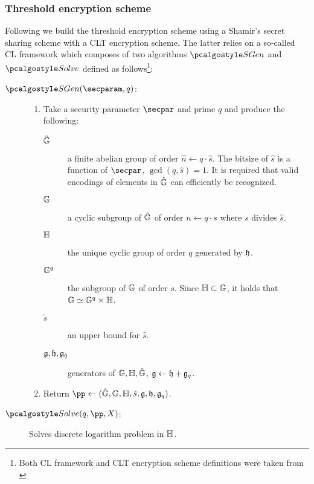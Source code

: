 \documentclass[runningheads,10pt]{llncs}
\numberwithin{equation}{section}
\begin{document}
  \subsubsection{Threshold encryption scheme}
  Following \cite{EPRINT:DGKOS20} we build the threshold encryption scheme using a
  Shamir's secret sharing scheme with a CLT \cite{AC:CasLagTuc18} encryption
  scheme. The latter relies on a so-called CL framework \cite{RSA:CasLag15} which
  composes of two algorithms $\sgen$ and $\solve$ defined as follows\footnote{Both CL
    framework and CLT encryption scheme definitions were taken from \cite{EPRINT:DGKOS20}}:
  \begin{description}
  \item[$\sgen (\secparam, q)$:]
    \begin{enumerate}
    \item Take a security parameter $\secpar$
    and prime $q$ and produce the following:
    \begin{description}
    \item [$\hat{\mathbb{G}}$]  a finite abelian group of order $\hat{n} \gets q \cdot
      \hat{s}$. The bitsize of $\hat{s}$ is a function of $\secpar$, $\gcd (q,
      \hat{s}) = 1$. It is required that valid encodings of elements in $\hat{\mathbb{G}}$ can
      efficiently be recognized.
    \item [$\mathbb{G}$]  a cyclic subgroup of $\hat{\mathbb{G}}$ of order $n \gets q \cdot s$ where
      $s$ divides $\hat{s}$.
    \item [$\mathbb{H}$]  the unique cyclic group of order $q$ generated by $\mathfrak{h}$.
    \item [$\mathbb{G}^q$]  the subgroup of $\mathbb{G}$ of order $s$. Since $\mathbb{H} \subset \mathbb{G}$,
      it holds that $\mathbb{G} \simeq \mathbb{G}^q \times \mathbb{H}$.
    \item [$\tilde{s}$]  an upper bound for $\hat{s}$.
    \item [$\mathfrak{g}, \mathfrak{h}, \mathfrak{g}_q$]  generators of $\mathbb{G}, \mathbb{H},
      \hat{\mathbb{G}}$, $\mathfrak{g} \gets \mathfrak{h} + \mathfrak{g}_q$.
    \end{description}
    \item Return $\pp \gets (\hGGG, \GGG, \HHH, \tilde{s}, \ggenerator, \hgenerator, \ggenerator_q)$. 
  \end{enumerate}
\item[$\solve (q, \pp, X)$:] Solves discrete logarithm problem in $\mathbb{H}$.
  \end{description}
\end{document}
